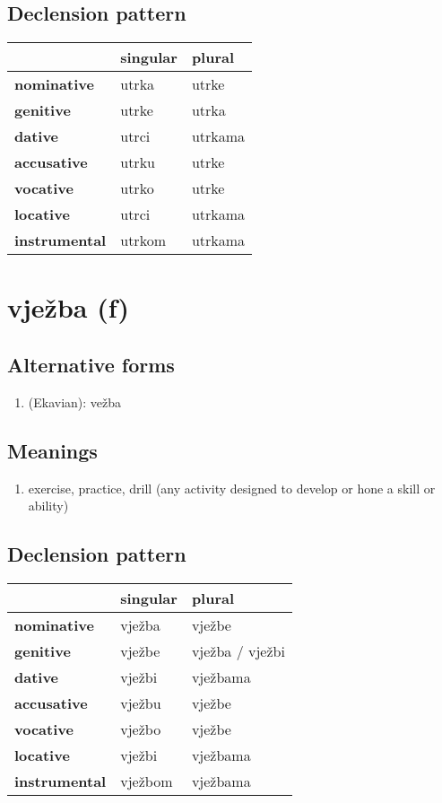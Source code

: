 \subsection*{Declension pattern}
\begin{tabularx}{\linewidth}{Xll}
\toprule
{} & singular &   plural \\
\midrule
\textbf{nominative  } &    utrka &    utrke \\
\textbf{genitive    } &    utrke &    utrka \\
\textbf{dative      } &    utrci &  utrkama \\
\textbf{accusative  } &    utrku &    utrke \\
\textbf{vocative    } &    utrko &    utrke \\
\textbf{locative    } &    utrci &  utrkama \\
\textbf{instrumental} &   utrkom &  utrkama \\
\bottomrule
\end{tabularx}

\filbreak
\section{vježba (f)}
\subsection*{Alternative forms}
\begin{enumerate}
\item (Ekavian): vežba
\end{enumerate}
\subsection*{Meanings}
\begin{enumerate}
\item exercise, practice, drill (any activity designed to develop or hone a skill or ability)
\end{enumerate}
\subsection*{Declension pattern}
\begin{tabularx}{\linewidth}{Xll}
\toprule
{} & singular &           plural \\
\midrule
\textbf{nominative  } &   vježba &           vježbe \\
\textbf{genitive    } &   vježbe &  vježba / vježbi \\
\textbf{dative      } &   vježbi &         vježbama \\
\textbf{accusative  } &   vježbu &           vježbe \\
\textbf{vocative    } &   vježbo &           vježbe \\
\textbf{locative    } &   vježbi &         vježbama \\
\textbf{instrumental} &  vježbom &         vježbama \\
\bottomrule
\end{tabularx}

